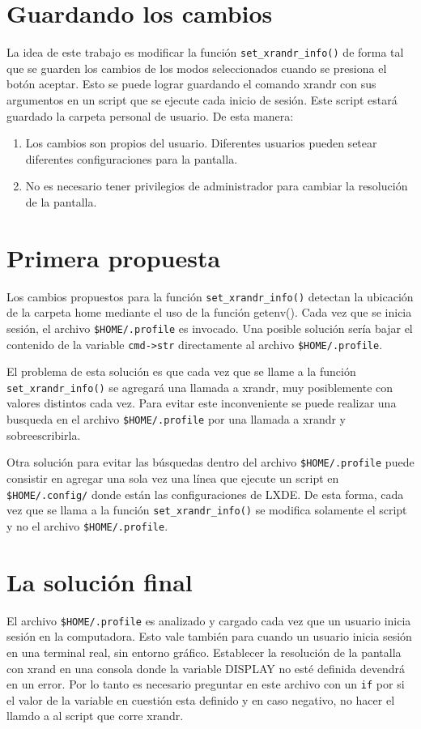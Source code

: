 \documentclass[final,narroweqnarray,inline,twoside]{ieee}
\begin{document}
\section{Guardando los cambios}
La idea de este trabajo es modificar la función \texttt{set\_xrandr\_info()} de forma tal que se guarden los cambios de los
modos seleccionados cuando se presiona el botón aceptar. Esto se puede lograr guardando el comando xrandr con sus argumentos
en un script que se ejecute cada inicio de sesión. Este script estará guardado la carpeta personal de usuario. De esta
manera:
\begin{enumerate}
 \item Los cambios son propios del usuario. Diferentes usuarios pueden setear diferentes configuraciones para la pantalla.
 \item No es necesario tener privilegios de administrador para cambiar la resolución de la pantalla.
\end{enumerate}


\section{Primera propuesta}
Los cambios propuestos para la función \texttt{set\_xrandr\_info()} detectan la ubicación de la carpeta home mediante el uso
de la función getenv(). Cada vez que se inicia sesión, el archivo \texttt{\$HOME/.profile} es invocado. Una posible solución
sería bajar el contenido de la variable \texttt{cmd->str} directamente al archivo \texttt{\$HOME/.profile}. 

El problema de esta solución es que cada vez que se llame a la función \texttt{set\_xrandr\_info()} se agregará una llamada
a xrandr, muy posiblemente con valores distintos cada vez. Para evitar este inconveniente se puede realizar una busqueda en
el archivo \texttt{\$HOME/.profile} por una llamada a xrandr y sobreescribirla.

Otra solución para evitar las búsquedas dentro del archivo \texttt{\$HOME/.profile} puede consistir en agregar una sola vez
una línea que ejecute un script en \texttt{\$HOME/.config/} donde están las configuraciones de LXDE. De esta forma, cada vez
que se llama a la función \texttt{set\_xrandr\_info()} se modifica solamente el script y no el archivo
\texttt{\$HOME/.profile}.

\section{La solución final}
El archivo \texttt{\$HOME/.profile} es analizado y cargado cada vez que un usuario inicia sesión en la computadora. Esto
vale también para cuando un usuario inicia sesión en una terminal real, sin entorno gráfico. Establecer la resolución de la
pantalla con xrand en una consola donde la variable DISPLAY no esté definida devendrá en un error. Por lo tanto es necesario
preguntar en este archivo con un \texttt{if} por si el valor de la variable en cuestión esta definido y en caso negativo, no
hacer el llamdo a al script que corre xrandr.
\end{document}
